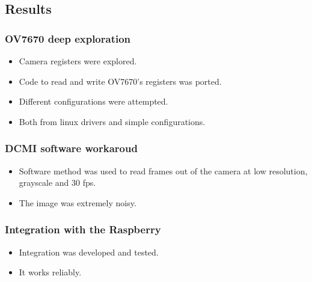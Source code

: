 \subsection{Results}


\subsubsection{OV7670 deep exploration}
\begin{itemize}
	\item Camera registers were explored.
	\item Code to read and write OV7670's registers was ported.
	\item Different configurations were attempted.
	\item Both from linux drivers and simple configurations.
\end{itemize}



\subsubsection{DCMI software workaroud}
\begin{itemize}
	\item Software method was used to read frames out of the camera at low resolution, grayscale and 30 fps.
	\item The image was extremely noisy.
\end{itemize}


\subsubsection{Integration with the Raspberry}
\begin{itemize}
	\item Integration was developed and tested.
	\item It works reliably.
\end{itemize}

